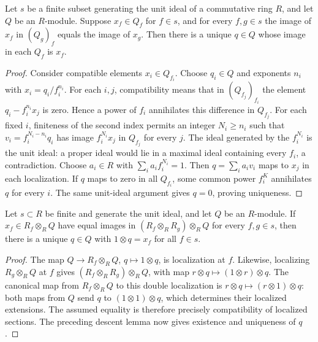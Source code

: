 \begin{lemma}
\label{lem:localized-sections-glue}
\leanok
Let $s$ be a finite subset generating the unit ideal of a commutative
ring $R$, and let $Q$ be an $R$-module. Suppose $x_f\in Q_f$ for
$f\in s$, and for every $f,g\in s$ the image of $x_f$ in $(Q_g)_f$
equals the image of $x_g$. Then there is a unique $q\in Q$ whose
image in each $Q_f$ is $x_f$.
\end{lemma}
\begin{proof}
Consider compatible elements $x_i\in Q_{f_i}$. Choose
$q_i\in Q$ and exponents $n_i$ with $x_i=q_i/f_i^{n_i}$.
For each $i,j$, compatibility means that in $(Q_{f_j})_{f_i}$
the element $q_i-f_i^{n_i}x_j$ is zero. Hence a power of $f_i$
annihilates this difference in $Q_{f_j}$. For each fixed $i$, finiteness of the second index permits an
integer $N_i\geq n_i$ such that
$v_i=f_i^{N_i-n_i}q_i$ has image $f_i^{N_i}x_j$ in $Q_{f_j}$ for every $j$.
The ideal generated by the $f_i^{N_i}$ is the unit ideal: a proper ideal
would lie in a maximal ideal containing every $f_i$, a contradiction.
Choose $a_i\in R$ with $\sum_i a_i f_i^{N_i}=1$. Then
$q=\sum_i a_i v_i$ maps to $x_j$ in each localization.
If $q$ maps to zero in all $Q_{f_i}$, some common power $f_i^K$
annihilates $q$ for every $i$. The same unit-ideal argument gives
$q=0$, proving uniqueness.
\end{proof}

\begin{lemma}
\label{lem:tensor-localization-descent}
\leanok
Let $s\subset R$ be finite and generate the unit ideal, and let
$Q$ be an $R$-module. If $x_f\in R_f\otimes_R Q$ have equal images
in $(R_f\otimes_R R_g)\otimes_R Q$ for every $f,g\in s$, then
there is a unique $q\in Q$ with $1\otimes q=x_f$ for all $f\in s$.
\end{lemma}
\begin{proof}
The map $Q\to R_f\otimes_R Q$, $q\mapsto1\otimes q$,
is localization at $f$. Likewise, localizing $R_g\otimes_R Q$
at $f$ gives $(R_f\otimes_R R_g)\otimes_R Q$, with map
$r\otimes q\mapsto(1\otimes r)\otimes q$. The canonical map
from $R_f\otimes_R Q$ to this double localization is
$r\otimes q\mapsto(r\otimes1)\otimes q$: both maps from $Q$
send $q$ to $(1\otimes1)\otimes q$, which determines their
localized extensions. The assumed equality is therefore precisely
compatibility of localized sections. The preceding descent lemma
now gives existence and uniqueness of $q$.
\end{proof}

